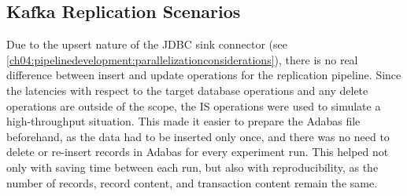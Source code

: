 \subsection{Kafka Replication Scenarios}
\label{ch05:methodology:design:scenarios}
Due to the upsert nature of the \ac{JDBC} sink connector (see \ref{ch04:pipelinedevelopment:parallelizationconsiderations}), there is no real difference between insert and update operations for the replication pipeline. Since the latencies with respect to the target database operations and any delete operations are outside of the scope, the \ac{IS} operations were used to simulate a high-throughput situation. This made it easier to prepare the Adabas file beforehand, as the data had to be inserted only once, and there was no need to delete or re-insert records in Adabas for every experiment run. This helped not only with saving time between each run, but also with reproducibility, as the number of records, record content, and transaction content remain the same.

